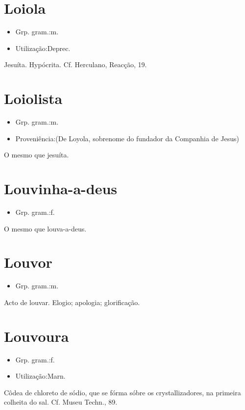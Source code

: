 \section{Loiola}
\begin{itemize}
\item {Grp. gram.:m.}
\end{itemize}
\begin{itemize}
\item {Utilização:Deprec.}
\end{itemize}
Jesuíta.
Hypócrita. Cf. Herculano, \textunderscore Reacção\textunderscore , 19.
\section{Loiolista}
\begin{itemize}
\item {Grp. gram.:m.}
\end{itemize}
\begin{itemize}
\item {Proveniência:(De \textunderscore Loyola\textunderscore , sobrenome do fundador da Companhia de Jesus)}
\end{itemize}
O mesmo que \textunderscore jesuíta\textunderscore .
\section{Louvinha-a-deus}
\begin{itemize}
\item {Grp. gram.:f.}
\end{itemize}
O mesmo que \textunderscore louva-a-deus\textunderscore .
\section{Louvor}
\begin{itemize}
\item {Grp. gram.:m.}
\end{itemize}
Acto de louvar.
Elogio; apologia; glorificação.
\section{Louvoura}
\begin{itemize}
\item {Grp. gram.:f.}
\end{itemize}
\begin{itemize}
\item {Utilização:Marn.}
\end{itemize}
Côdea de chloreto de sódio, que se fórma sóbre os crystallizadores, na primeira colheita do sal. Cf. \textunderscore Museu Techn.\textunderscore , 89.
